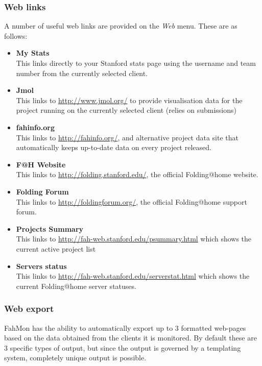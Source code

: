 \subsubsection{Web links}

A number of useful web links are provided on the \textit{Web} menu. These are as
follows:
\begin{itemize}
 \item \textbf{My Stats}
  \\This links directly to your Stanford stats page using the username and team
number from the currently selected client.
 \item \textbf{Jmol}
  \\This links to \url{http://www.jmol.org/} to provide visualisation data for
the project running on the currently selected client (relies on submissions)
 \item \textbf{fahinfo.org}
  \\This links to \url{http://fahinfo.org/}, and alternative project data site
that automatically keeps up-to-date data on every project released.
 \item \textbf{F@H Website}
  \\This links to \url{http://folding.stanford.edu/}, the official Folding@home
website.
 \item \textbf{Folding Forum}
  \\This links to \url{http://foldingforum.org/}, the official Folding@home
support forum.
 \item \textbf{Projects Summary}
  \\This links to \url{http://fah-web.stanford.edu/psummary.html} which shows
the current active project list
 \item \textbf{Servers status}
  \\This links to \url{http://fah-web.stanford.edu/serverstat.html} which shows
the current Folding@home server statuses.
\end{itemize}


\subsubsection{Web export}

FahMon has the ability to automatically export up to 3 formatted web-pages based
on the data obtained from the clients it is monitored. By default these are 3
specific types of output, but since the output is governed by a templating
system, completely unique output is possible.

